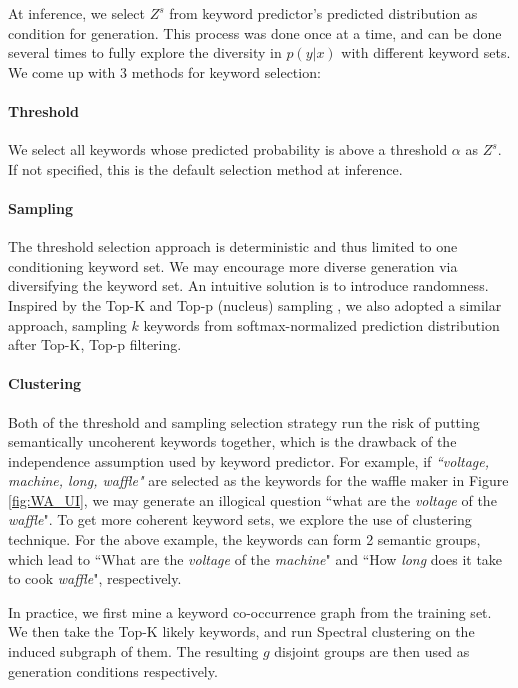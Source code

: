 \documentclass[letterpaper]{article} %
\begin{document}
At inference, we select $Z^s$ from keyword predictor's predicted distribution as condition for generation. This process was done once at a time, and can be done several times to fully explore the diversity in $p(y|x)$ with different keyword sets. We come up with 3 methods for keyword selection:

\paragraph{Threshold} We select all keywords whose predicted probability is above a threshold $\alpha$ as $Z^s$. If not specified, this is the default selection method at inference.

\paragraph{Sampling} The threshold selection approach is deterministic and thus limited to one conditioning keyword set. We may encourage more diverse generation via diversifying the keyword set. An intuitive solution is to introduce randomness. Inspired by the Top-K \citep{fan-etal-2018-hierarchical, radford2019language} and Top-p (nucleus) sampling \citep{holtzman2019curious}, we also adopted a similar approach, sampling $k$ keywords from softmax-normalized prediction distribution after Top-K, Top-p filtering.

\paragraph{Clustering} Both of the threshold and sampling selection strategy run the risk of putting semantically uncoherent keywords together, which is the drawback of the independence assumption used by keyword predictor. For example, if \textit{``voltage, machine, long, waffle"} are selected as the keywords for the waffle maker in Figure \ref{fig:WA_UI}, we may generate an illogical question ``what are the \textit{voltage} of the \textit{waffle}". To get more coherent keyword sets, we explore the use of clustering technique. For the above example, the keywords can form 2 semantic groups, which lead to ``What are the \textit{voltage} of the \textit{machine}" and ``How \textit{long} does it take to cook \textit{waffle}", respectively. 

In practice, we first mine a keyword co-occurrence graph from the training set. We then take the Top-K likely keywords, and run Spectral clustering \citep{Shi00normalizedcuts} on the induced subgraph of them. The resulting $g$ disjoint groups are then used as generation conditions respectively.
\end{document}
